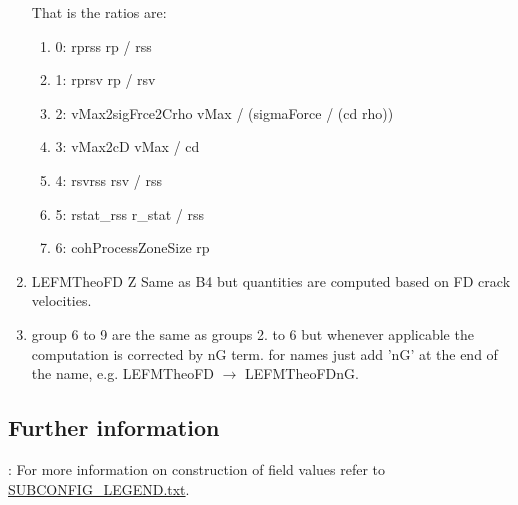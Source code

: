 \documentclass[10pt]{article}
\begin{document}
\begin{enumerate}
			That is the ratios are:
			\begin{enumerate}
			\item 0:	rprss				rp / rss
			\item 1:	rprsv				rp / rsv
			\item 2:	vMax2sigFrce2Crho		vMax / (sigmaForce / (cd rho))
			\item 3:	vMax2cD			vMax / cd 
			\item 4:	rsvrss			rsv / rss
			\item 5:	rstat\_rss			r\_stat / rss
			\item 6:	cohProcessZoneSize	rp
			\end{enumerate}
\item LEFMTheoFD	Z			Same as B4 but quantities are computed based on FD crack velocities.
\item group 6 to 9 are the same as groups 2. to 6 but whenever applicable the computation is corrected by nG term.
  			for names just add 'nG' at the end of the name, e.g. LEFMTheoFD $\rightarrow$ LEFMTheoFDnG.
\end{enumerate}
\subsection{Further information}: For more information on construction of field values refer to 
\href{run:SUBCONFIG_LEGEND.txt}{SUBCONFIG\_LEGEND.txt}.
\end{document}
